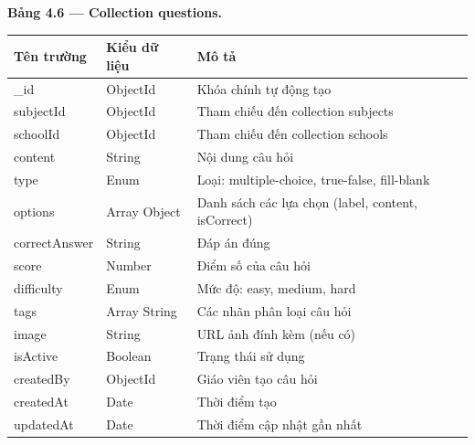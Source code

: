 ﻿\documentclass[../DoAn.tex]{subfiles}
\begin{document}
\vspace{0.3cm}

\noindent\textbf{Bảng 4.6 — Collection questions.}
\begin{center}
\begin{tabular}{|p{3.5cm}|p{2.5cm}|p{7cm}|}
\hline
\textbf{Tên trường} & \textbf{Kiểu dữ liệu} & \textbf{Mô tả} \\ \hline
\_id & ObjectId & Khóa chính tự động tạo \\ \hline
subjectId & ObjectId & Tham chiếu đến collection subjects \\ \hline
schoolId & ObjectId & Tham chiếu đến collection schools \\ \hline
content & String & Nội dung câu hỏi \\ \hline
type & Enum & Loại: multiple-choice, true-false, fill-blank \\ \hline
options & Array Object & Danh sách các lựa chọn (label, content, isCorrect) \\ \hline
correctAnswer & String & Đáp án đúng \\ \hline
score & Number & Điểm số của câu hỏi \\ \hline
difficulty & Enum & Mức độ: easy, medium, hard \\ \hline
tags & Array String & Các nhãn phân loại câu hỏi \\ \hline
image & String & URL ảnh đính kèm (nếu có) \\ \hline
isActive & Boolean & Trạng thái sử dụng \\ \hline
createdBy & ObjectId & Giáo viên tạo câu hỏi \\ \hline
createdAt & Date & Thời điểm tạo \\ \hline
updatedAt & Date & Thời điểm cập nhật gần nhất \\ \hline
\end{tabular}
\end{center}

\vspace{0.3cm}
\end{document}
